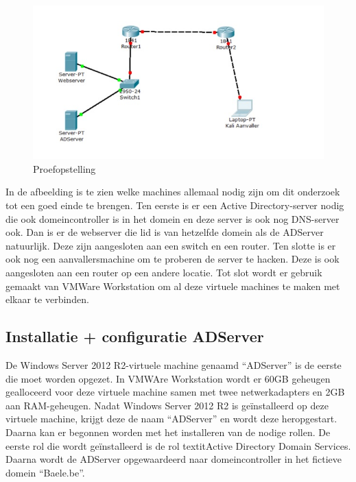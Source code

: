 \documentclass[pdftex,a4paper,12pt]{report}
\begin{document}
\begin{figure}[h!]
\begin{center}
\includegraphics{img/Situatie}
\end{center}
\caption{Proefopstelling}
\end{figure}

In de afbeelding is te zien welke machines allemaal nodig zijn om dit onderzoek tot een goed einde te brengen. Ten eerste is er een Active Directory-server nodig die ook domeincontroller is in het domein en deze server is ook nog DNS-server ook. Dan is er de webserver die lid is van hetzelfde domein als de ADServer natuurlijk. Deze zijn aangesloten aan een switch en een router. Ten slotte is er ook nog een aanvallersmachine om te proberen de server te hacken. Deze is ook aangesloten aan een router op een andere locatie. Tot slot wordt er gebruik gemaakt van VMWare Workstation om al deze virtuele machines te maken met elkaar te verbinden.

\subsection{Installatie + configuratie ADServer}
De Windows Server 2012 R2-virtuele machine genaamd "`ADServer"' is de eerste die moet worden opgezet. In VMWAre Workstation wordt er 60GB geheugen gealloceerd voor deze virtuele machine samen met twee netwerkadapters en 2GB aan RAM-geheugen. Nadat Windows Server 2012 R2 is geïnstalleerd op deze virtuele machine, krijgt deze de naam "`ADServer"' en wordt deze heropgestart. Daarna kan er begonnen worden met het installeren van de nodige rollen. De eerste rol die wordt geïnstalleerd is de rol textit{Active Directory Domain Services}. Daarna wordt de ADServer opgewaardeerd naar domeincontroller in het fictieve domein "`Baele.be"'. \newline 
\end{document}
